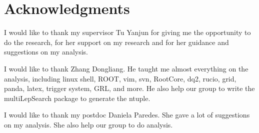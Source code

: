 
\chapter*{Acknowledgments}

I would like to thank my supervisor Tu Yanjun for giving me the opportunity to do the research, for her support on my research and for her guidance and suggestions on my analysis.

I would like to thank Zhang Dongliang. He taught me almost everything on the analysis, including linux shell, ROOT, vim, svn, RootCore, dq2, rucio, grid, panda, latex, trigger system, GRL, and more.
He also help our group to write the multiLepSearch package to generate the ntuple.

I would like to thank my postdoc Daniela Paredes.
She gave a lot of suggestions on my analysis.
She also help our group to do analysis.


